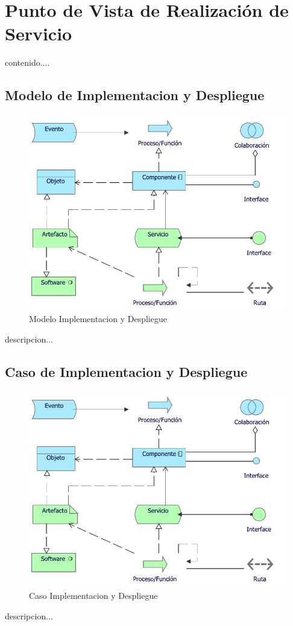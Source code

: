 \section{Punto de Vista de Realización de Servicio}
contenido....
\subsection{Modelo de Implementacion y Despliegue}
\begin{figure}[h!]
	\centering
	\includegraphics[width=.5\linewidth]{imgs/modelo/Implementacion}
	\caption{Modelo Implementacion y Despliegue}
\end{figure}
descripcion...

\newpage

\subsection{Caso  de Implementacion y Despliegue}
\begin{figure}[h!]
	\centering
	\includegraphics[width=.5\linewidth]{imgs/caso/Implementacion}
	\caption{Caso Implementacion y Despliegue}
\end{figure}
descripcion...